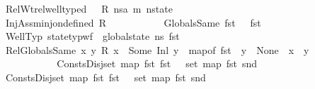 \begin{isabellebody}
\ \ \ \ \ \ \ \ \ \ RelWt{\isacharcolon}{\kern0pt}{\isachardoublequoteopen}rel{\isacharunderscore}{\kern0pt}well{\isacharunderscore}{\kern0pt}typed\ {\isasymLambda}\ {\isasymOmega}\ R\ {\isacharparenleft}{\kern0pt}ns{\isacharcolon}{\kern0pt}{\isacharcolon}{\kern0pt}{\isacharparenleft}{\kern0pt}{\isacharprime}{\kern0pt}a{\isacharcomma}{\kern0pt}\ {\isacharprime}{\kern0pt}m{\isacharparenright}{\kern0pt}\ nstate{\isacharparenright}{\kern0pt}{\isachardoublequoteclose}\ \isanewline
\ \ \ \ \ \ \ \ \ \ InjAssm{\isacharcolon}{\kern0pt}{\isachardoublequoteopen}inj{\isacharunderscore}{\kern0pt}on{\isacharunderscore}{\kern0pt}defined\ R{\isachardoublequoteclose}\ \isanewline
\ \ \ \ \ \ \ \ \ \ GlobalsSame{\isacharcolon}{\kern0pt}\ {\isachardoublequoteopen}fst\ {\isasymLambda}\ {\isacharequal}{\kern0pt}\ fst\ {\isasymLambda}{\isacharprime}{\kern0pt}{\isachardoublequoteclose}\ \isanewline
\ \ \ \ \ \ \ \ \ \ WellTyp{\isacharcolon}{\kern0pt}\ {\isachardoublequoteopen}{\isacharparenleft}{\kern0pt}state{\isacharunderscore}{\kern0pt}typ{\isacharunderscore}{\kern0pt}wf\ {\isasymOmega}\ {\isacharparenleft}{\kern0pt}global{\isacharunderscore}{\kern0pt}state\ ns{\isacharparenright}{\kern0pt}\ {\isacharparenleft}{\kern0pt}fst\ {\isasymLambda}{\isacharparenright}{\kern0pt}{\isacharparenright}{\kern0pt}{\isachardoublequoteclose}\ \isanewline
\ \ \ \ \ \ \ \isanewline
\ \ \ \ \ \ \ \ \ \ RelGlobalsSame{\isacharcolon}{\kern0pt}\ {\isachardoublequoteopen}{\isasymforall}x\ y{\isachardot}{\kern0pt}\ R\ x\ {\isacharequal}{\kern0pt}\ Some\ {\isacharparenleft}{\kern0pt}Inl\ y{\isacharparenright}{\kern0pt}\ {\isasymlongrightarrow}\ map{\isacharunderscore}{\kern0pt}of\ {\isacharparenleft}{\kern0pt}fst\ {\isasymLambda}{\isacharprime}{\kern0pt}{\isacharparenright}{\kern0pt}\ y\ {\isasymnoteq}\ None\ {\isasymlongrightarrow}\ x\ {\isacharequal}{\kern0pt}\ y{\isachardoublequoteclose}\ \ \isanewline
\ \ \ \ \ \ \ \isanewline
\ \ \ \ \ \ \ \ \ \ ConstsDisj{\isacharcolon}{\kern0pt}{\isachardoublequoteopen}set\ {\isacharparenleft}{\kern0pt}map\ fst\ {\isacharparenleft}{\kern0pt}fst\ {\isasymLambda}{\isacharparenright}{\kern0pt}{\isacharparenright}{\kern0pt}\ {\isasyminter}\ set\ {\isacharparenleft}{\kern0pt}map\ fst\ {\isacharparenleft}{\kern0pt}snd\ {\isasymLambda}{\isacharparenright}{\kern0pt}{\isacharparenright}{\kern0pt}\ {\isacharequal}{\kern0pt}\ {\isacharbraceleft}{\kern0pt}{\isacharbraceright}{\kern0pt}{\isachardoublequoteclose}\ \isanewline
\ \ \ \ \ \ \ \ \ \ ConstsDisj{}{\isacharcolon}{\kern0pt}{\isachardoublequoteopen}set\ {\isacharparenleft}{\kern0pt}map\ fst\ {\isacharparenleft}{\kern0pt}fst\ {\isasymLambda}{\isacharprime}{\kern0pt}{\isacharparenright}{\kern0pt}{\isacharparenright}{\kern0pt}\ {\isasyminter}\ set\ {\isacharparenleft}{\kern0pt}map\ fst\ {\isacharparenleft}{\kern0pt}snd\ {\isasymLambda}{\isacharprime}{\kern0pt}{\isacharparenright}{\kern0pt}{\isacharparenright}{\kern0pt}\ {\isacharequal}{\kern0pt}\ {\isacharbraceleft}{\kern0pt}{\isacharbraceright}{\kern0pt}{\isachardoublequoteclose}\isanewline

\end{isabellebody}
